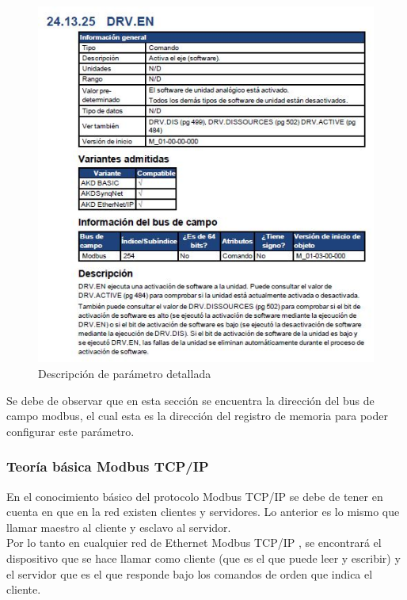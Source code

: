 \documentclass[12pt,titlepage]{article}
\begin{document}
 \begin{figure}[htbp]
\hspace*{1.1cm} 
\includegraphics[scale=1.2]{param2}
\caption{Descripción de parámetro detallada}
\end{figure}

Se debe de observar que en esta sección se encuentra la dirección del bus de campo modbus, el cual esta es la dirección del registro de memoria para poder configurar este parámetro. \\ 

\newpage
\subsubsection{Teoría básica Modbus TCP/IP}
En el conocimiento básico del protocolo Modbus TCP/IP se debe de tener en cuenta en que en la red existen clientes y servidores. Lo anterior es lo mismo que llamar maestro al cliente y esclavo al servidor. \\ 

Por lo tanto en cualquier red de Ethernet Modbus TCP/IP , se encontrará el dispositivo que se hace llamar como cliente (que es el que puede leer y escribir) y el servidor que es el que responde bajo los comandos de orden que indica el cliente. \\ 
\end{document}
